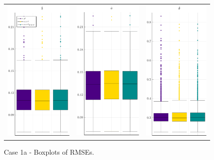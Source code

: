 \begin{figure}[H] 
	\centering \begin{tabular}[b]{c c c}
		\includegraphics[width=.3\textwidth]{Figures/1a/RMSE_b.pdf} & \includegraphics[width=.3\textwidth]{Figures/1a/RMSE_a.pdf} & \includegraphics[width=.3\textwidth]{Figures/1a/RMSE_t.pdf}
	\end{tabular}
	\caption{Case 1a - Boxplots of RMSEs.}
	\label{fig:bpRMSE1a}
\end{figure}
